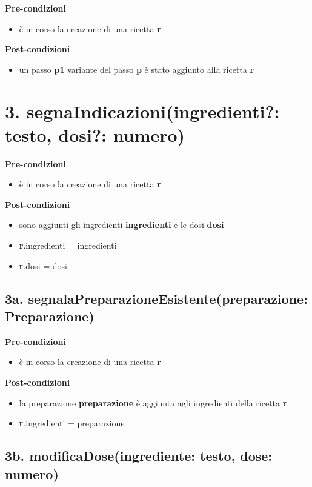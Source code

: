 \documentclass[14pt]{extarticle}
\begin{document}
\textbf{Pre-condizioni}
\begin{itemize}
  \item è in corso la creazione di una ricetta  \textbf{r}
\end{itemize}
\textbf{Post-condizioni}
\begin{itemize}
  \item un passo  \textbf{p1} variante del passo  \textbf{p} è stato aggiunto alla ricetta  \textbf{r}
\end{itemize}

\section*{3. segnaIndicazioni(ingredienti?: testo, dosi?: numero)}

\textbf{Pre-condizioni}
\begin{itemize}
  \item è in corso la creazione di una ricetta  \textbf{r}
\end{itemize}
\textbf{Post-condizioni}
\begin{itemize}
  \item sono aggiunti gli ingredienti  \textbf{ingredienti} e le dosi  \textbf{dosi}
  \item \textbf{r}.ingredienti = ingredienti
  \item \textbf{r}.dosi = dosi
\end{itemize}

\subsection*{3a. segnalaPreparazioneEsistente(preparazione: Preparazione)}

\textbf{Pre-condizioni}
\begin{itemize}
  \item è in corso la creazione di una ricetta  \textbf{r}
\end{itemize}
\textbf{Post-condizioni}
\begin{itemize}
  \item la preparazione  \textbf{preparazione} è aggiunta agli ingredienti della ricetta  \textbf{r}
  \item \textbf{r}.ingredienti = preparazione
\end{itemize}

\subsection*{3b. modificaDose(ingrediente: testo, dose: numero)}
\end{document}
